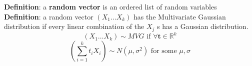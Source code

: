 \begin{framed}
   \textbf{Definition}: a \textbf{random vector} is an ordered list of random variables \\

   \textbf{Definition}: a random vector $(X_1 \hdots X_k)$ has the Multivariate Gaussian distribution if every linear combination of the $X_j$ s has a Gaussian distribution. \\
   \[
      (X_1 \hdots X_k) \sim MVG \text{ if } \forall \textbf{t} \in \mathbb{R}^k
   \] 
   \[
         \left( \sum_{i = 1}^{k} t_i X_i \right) \sim N(\mu, \sigma^2) \text{ for some } \mu, \sigma
   \] 
\end{framed}








